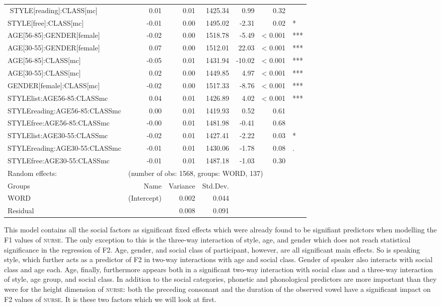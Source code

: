 {\begin{longtable}[c]{p{}rrrrrl}
$$		STYLE[reading]:CLASS[mc] & 0.01 & 0.01 & 1425.34 & 0.99 & 0.32 & \\ 
		STYLE[free]:CLASS[mc] & -0.01 & 0.00 & 1495.02 & -2.31 & 0.02 & *\\ 
		AGE[56-85]:GENDER[female] & -0.02 & 0.00 & 1518.78 & -5.49 & < 0.001 & *** \\ 
		AGE[30-55]:GENDER[female] & 0.07 & 0.00 & 1512.01 & 22.03 & < 0.001 & *** \\ 
		AGE[56-85]:CLASS[mc] & -0.05 & 0.01 & 1431.94 & -10.02 & < 0.001 & *** \\ 
		AGE[30-55]:CLASS[mc] & 0.02 & 0.00 & 1449.85 & 4.97 & < 0.001 & *** \\ 
		GENDER[female]:CLASS[mc] & -0.02 & 0.00 & 1517.33 & -8.76 & < 0.001 & *** \\ 
		STYLElist:AGE56-85:CLASSmc & 0.04 & 0.01 & 1426.89 & 4.02 & < 0.001 & *** \\ 
		STYLEreading:AGE56-85:CLASSmc & 0.00 & 0.01 & 1419.93 & 0.52 & 0.61 & \\ 
		STYLEfree:AGE56-85:CLASSmc & -0.00 & 0.01 & 1481.98 & -0.41 & 0.68 & \\ 
		STYLElist:AGE30-55:CLASSmc & -0.02 & 0.01 & 1427.41 & -2.22 & 0.03 & * \\ 
		STYLEreading:AGE30-55:CLASSmc & -0.01 & 0.01 & 1430.06 & -1.78 & 0.08 & .\\ 
		STYLEfree:AGE30-55:CLASSmc & -0.01 & 0.01 & 1487.18 & -1.03 & 0.30 & \\ 
		\hline
		Random effects: & \multicolumn{6}{l}{(number of obs: 1568, groups: WORD, 137)} \\
		Groups &         Name & Variance &      Std.Dev. & & & \\
		WORD &  (Intercept) & 0.002 & 0.044 & & & \\
		Residual  &         & 0.008 & 0.091 & & & \\
		\hline
	\end{longtable}
	
}


This model contains all the social factors as significant fixed effects which were already found to be signifiant predictors when modelling the F1 values of \textsc{nurse}.
The only exception to this is the three-way interaction of style, age, and gender which does not reach statistical significance in the regression of F2.
Age, gender, and social class of participant, however, are all significant main effects.
So is speaking style, which further acts as a predictor of F2 in two-way interactions with age and social class.
Gender of speaker also interacts with social class and age each.
Age, finally, furthermore appears both in a significant two-way interaction with social class and a three-way interaction of style, age group, and social class.
In addition to the social categories, phonetic and phonological predictors are more important than they were for the height dimension of \textsc{nurse}: both the preceding consonant and the duration of the observed vowel have a significant impact on F2 values of \textsc{nurse}.
It is these two factors which we will look at first.

